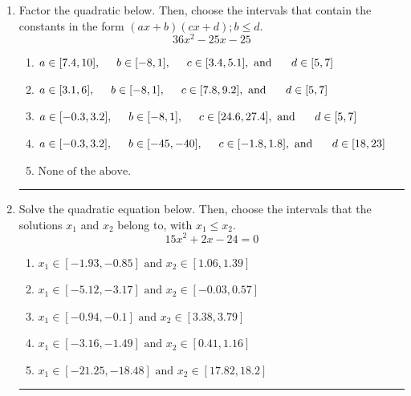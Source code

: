 \documentclass[14pt]{extbook}
\newcommand{\litem}[1]{\item#1\hspace*{-1cm}\rule{\textwidth}{0.4pt}}
\begin{document}
\begin{enumerate}
{\begin{enumerate}[label=\Alph*.]
\end{enumerate} }
\litem{
Factor the quadratic below. Then, choose the intervals that contain the constants in the form $(ax+b)(cx+d); b \leq d.$\[ 36x^{2} -25 x -25 \]\begin{enumerate}[label=\Alph*.]
\item \( a \in [7.4, 10], \hspace*{5mm} b \in [-8, 1], \hspace*{5mm} c \in [3.4, 5.1], \text{ and } \hspace*{5mm} d \in [5, 7] \)
\item \( a \in [3.1, 6], \hspace*{5mm} b \in [-8, 1], \hspace*{5mm} c \in [7.8, 9.2], \text{ and } \hspace*{5mm} d \in [5, 7] \)
\item \( a \in [-0.3, 3.2], \hspace*{5mm} b \in [-8, 1], \hspace*{5mm} c \in [24.6, 27.4], \text{ and } \hspace*{5mm} d \in [5, 7] \)
\item \( a \in [-0.3, 3.2], \hspace*{5mm} b \in [-45, -40], \hspace*{5mm} c \in [-1.8, 1.8], \text{ and } \hspace*{5mm} d \in [18, 23] \)
\item \( \text{None of the above.} \)

\end{enumerate} }
\litem{
Solve the quadratic equation below. Then, choose the intervals that the solutions $x_1$ and $x_2$ belong to, with $x_1 \leq x_2$.\[ 15x^{2} +2 x -24 = 0 \]\begin{enumerate}[label=\Alph*.]
\item \( x_1 \in [-1.93, -0.85] \text{ and } x_2 \in [1.06, 1.39] \)
\item \( x_1 \in [-5.12, -3.17] \text{ and } x_2 \in [-0.03, 0.57] \)
\item \( x_1 \in [-0.94, -0.1] \text{ and } x_2 \in [3.38, 3.79] \)
\item \( x_1 \in [-3.16, -1.49] \text{ and } x_2 \in [0.41, 1.16] \)
\item \( x_1 \in [-21.25, -18.48] \text{ and } x_2 \in [17.82, 18.2] \)


\end{enumerate}}
\end{enumerate}
\end{document}

